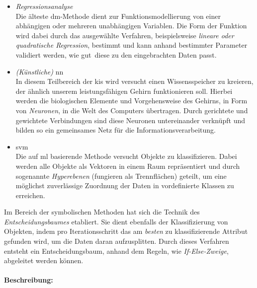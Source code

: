 \begin{itemize}
\item \textit{Regressionsanalyse}
\\ Die älteste \gls{dm}-Methode dient zur Funktionsmodellierung von einer abhängigen oder mehreren unabhängigen Variablen. Die Form der Funktion wird dabei durch das ausgewählte Verfahren, beispielsweise \textit{lineare oder quadratische Regression}, bestimmt und kann anhand bestimmter Parameter validiert werden, wie \glqq gut\grqq~diese zu den eingebrachten Daten passt.

\item \textit{(Künstliche)} \gls{nn}
\\ In diesem Teilbereich der \glspl{ki} wird versucht einen Wissensspeicher zu kreieren, der ähnlich unserem leistungsfähigen Gehirn funktionieren soll. Hierbei werden die biologischen Elemente und Vorgehensweise des Gehirns, in Form von \textit{Neuronen}, in die Welt des Computers übertragen. Durch gerichtete und gewichtete Verbindungen sind diese Neuronen untereinander verknüpft und bilden so ein gemeinsames Netz für die Informationsverarbeitung.

\item \gls{svm}
\\ Die auf \gls{ml} basierende Methode versucht Objekte zu klassifizieren. Dabei werden alle Objekte als Vektoren in einem Raum repräsentiert und durch sogenannte \textit{Hyperebenen} (fungieren als Trennflächen) geteilt, um eine möglichst zuverlässige Zuordnung der Daten in vordefinierte Klassen zu erreichen.
\end{itemize}

Im Bereich der symbolischen Methoden hat sich die Technik des \textit{Entscheidungsbaumes} etabliert. Sie dient ebenfalls der Klassifizierung von Objekten, indem pro Iterationsschritt das am \textit{besten} zu klassifizierende Attribut gefunden wird, um die Daten daran aufzusplitten. Durch dieses Verfahren entsteht ein Entscheidungsbaum, anhand dem Regeln, wie \textit{If-Else-Zweige}, abgeleitet werden können.

\paragraph{Beschreibung:}

